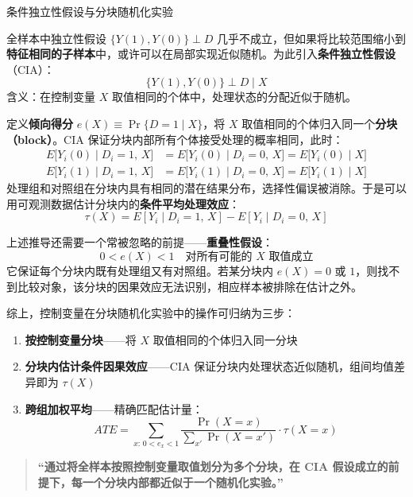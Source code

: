 \begin{frame}[allowframebreaks]{条件独立性假设与分块随机化实验}

全样本中独立性假设 $\{Y(1), Y(0)\} \perp D$ 几乎不成立，但如果将比较范围缩小到\textbf{特征相同的子样本}中，或许可以在局部实现近似随机。为此引入\textbf{条件独立性假设}（CIA）：
\[
  \{Y(1), Y(0)\} \perp D \mid X
\]
含义：在控制变量 $X$ 取值相同的个体中，处理状态的分配近似于随机。

\vspace{0.8em}

定义\textbf{倾向得分} $e(X) \equiv \Pr\{D=1 \mid X\}$，将 $X$ 取值相同的个体归入同一个\textbf{分块（block）}。CIA 保证分块内部所有个体接受处理的概率相同，此时：
\begin{align*}
  E\big[Y_i(0) \mid D_i=1,\, X\big]
    &= E\big[Y_i(0) \mid D_i=0,\, X\big]
     = E\big[Y_i(0) \mid X\big] \\[0.3em]
  E\big[Y_i(1) \mid D_i=1,\, X\big]
    &= E\big[Y_i(1) \mid D_i=0,\, X\big]
     = E\big[Y_i(1) \mid X\big]
\end{align*}
处理组和对照组在分块内具有相同的潜在结果分布，选择性偏误被消除。于是可以用可观测数据估计分块内的\textbf{条件平均处理效应}：
\[
  \tau(X) = E[Y_i \mid D_i=1,\, X] - E[Y_i \mid D_i=0,\, X]
\]

\framebreak

上述推导还需要一个常被忽略的前提——\textbf{重叠性假设}：
\[
  0 < e(X) < 1 \quad \text{对所有可能的 } X \text{ 取值成立}
\]
它保证每个分块内既有处理组又有对照组。若某分块内 $e(X)=0$ 或 $1$，则找不到比较对象，该分块的因果效应无法识别，相应样本被排除在估计之外。

\vspace{0.8em}

综上，控制变量在分块随机化实验中的操作可归纳为三步：
\begin{enumerate}
  \item \textbf{按控制变量分块}——将 $X$ 取值相同的个体归入同一分块
  \item \textbf{分块内估计条件因果效应}——CIA 保证分块内处理状态近似随机，组间均值差异即为 $\tau(X)$
  \item \textbf{跨组加权平均}——精确匹配估计量：
    \[
      ATE = \sum_{x:\, 0<e_x<1}
        \frac{\Pr(X=x)}{\sum_{x'}\Pr(X=x')} \cdot \tau(X=x)
    \]

\end{enumerate}


  \vspace{1em}
  \begin{quote}
    \Large \textbf{``通过将全样本按照控制变量取值划分为多个分块，在 CIA 假设成立的前提下，每一个分块内部都近似于一个随机化实验。''}
  \end{quote}
  \vspace{1em}

\end{frame}